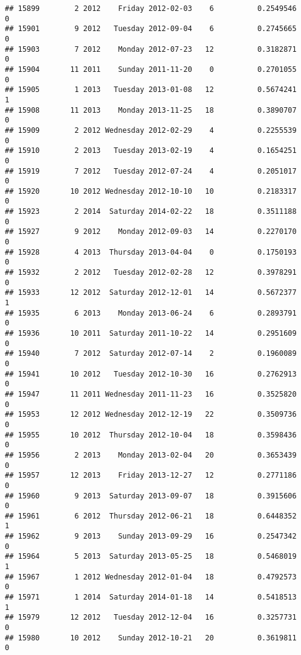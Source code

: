 \documentclass[
]{article}
\begin{document}
\begin{verbatim}
## 15899        2 2012    Friday 2012-02-03    6          0.2549546             0
## 15901        9 2012   Tuesday 2012-09-04    6          0.2745665             0
## 15903        7 2012    Monday 2012-07-23   12          0.3182871             0
## 15904       11 2011    Sunday 2011-11-20    0          0.2701055             0
## 15905        1 2013   Tuesday 2013-01-08   12          0.5674241             1
## 15908       11 2013    Monday 2013-11-25   18          0.3890707             0
## 15909        2 2012 Wednesday 2012-02-29    4          0.2255539             0
## 15910        2 2013   Tuesday 2013-02-19    4          0.1654251             0
## 15919        7 2012   Tuesday 2012-07-24    4          0.2051017             0
## 15920       10 2012 Wednesday 2012-10-10   10          0.2183317             0
## 15923        2 2014  Saturday 2014-02-22   18          0.3511188             0
## 15927        9 2012    Monday 2012-09-03   14          0.2270170             0
## 15928        4 2013  Thursday 2013-04-04    0          0.1750193             0
## 15932        2 2012   Tuesday 2012-02-28   12          0.3978291             0
## 15933       12 2012  Saturday 2012-12-01   14          0.5672377             1
## 15935        6 2013    Monday 2013-06-24    6          0.2893791             0
## 15936       10 2011  Saturday 2011-10-22   14          0.2951609             0
## 15940        7 2012  Saturday 2012-07-14    2          0.1960089             0
## 15941       10 2012   Tuesday 2012-10-30   16          0.2762913             0
## 15947       11 2011 Wednesday 2011-11-23   16          0.3525820             0
## 15953       12 2012 Wednesday 2012-12-19   22          0.3509736             0
## 15955       10 2012  Thursday 2012-10-04   18          0.3598436             0
## 15956        2 2013    Monday 2013-02-04   20          0.3653439             0
## 15957       12 2013    Friday 2013-12-27   12          0.2771186             0
## 15960        9 2013  Saturday 2013-09-07   18          0.3915606             0
## 15961        6 2012  Thursday 2012-06-21   18          0.6448352             1
## 15962        9 2013    Sunday 2013-09-29   16          0.2547342             0
## 15964        5 2013  Saturday 2013-05-25   18          0.5468019             1
## 15967        1 2012 Wednesday 2012-01-04   18          0.4792573             0
## 15971        1 2014  Saturday 2014-01-18   14          0.5418513             1
## 15979       12 2012   Tuesday 2012-12-04   16          0.3257731             0
## 15980       10 2012    Sunday 2012-10-21   20          0.3619811             0

\end{verbatim}
\end{document}
